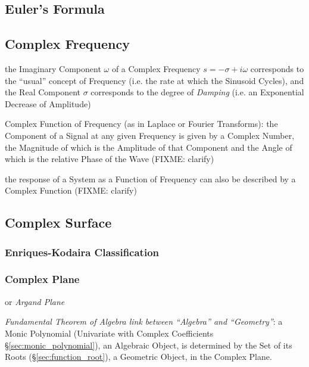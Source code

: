 \subsection{Euler's Formula}\label{sec:eulers_formula}

\subsection{Complex Frequency}\label{sec:complex_frequency}

the Imaginary Component $\omega$ of a Complex Frequency $s = -\sigma + i\omega$
corresponds to the ``usual'' concept of Frequency (i.e. the rate at which the
Sinusoid Cycles), and the Real Component $\sigma$ corresponds to the degree of
\emph{Damping} (i.e. an Exponential Decrease of Amplitude)

Complex Function of Frequency (as in Laplace or Fourier Transforms): the
Component of a Signal at any given Frequency is given by a Complex Number, the
Magnitude of which is the Amplitude of that Component and the Angle of which is
the relative Phase of the Wave (FIXME: clarify)

the response of a System as a Function of Frequency can also be described by a
Complex Function (FIXME: clarify)



\subsection{Complex Surface}\label{sec:complex_surface}

\subsubsection{Enriques-Kodaira Classification}
\label{sec:enriques_kodaira}

\subsubsection{Complex Plane}\label{sec:complex_plane}

or \emph{Argand Plane}

\emph{Fundamental Theorem of Algebra link between ``Algebra'' and
  ``Geometry''}: a Monic Polynomial (Univariate with Complex Coefficients
\S\ref{sec:monic_polynomial}), an Algebraic Object, is determined by the Set of
its Roots (\S\ref{sec:function_root}), a Geometric Object, in the Complex
Plane.



